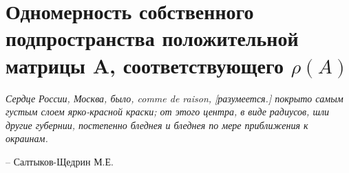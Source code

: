 \chapter{Одномерность собственного подпространства положительной матрицы A, соответствующего $\rho(A)$}
\label{cha:30}

\epigraph{
	\textit{Сердце России, Москва, было, comme de raison, [разумеется.] покрыто самым густым слоем ярко-красной краски; от этого центра, в виде радиусов, шли другие губернии, постепенно бледнея и бледнея по мере приближения к окраинам.}}
{-- Салтыков-Щедрин М.Е.}



